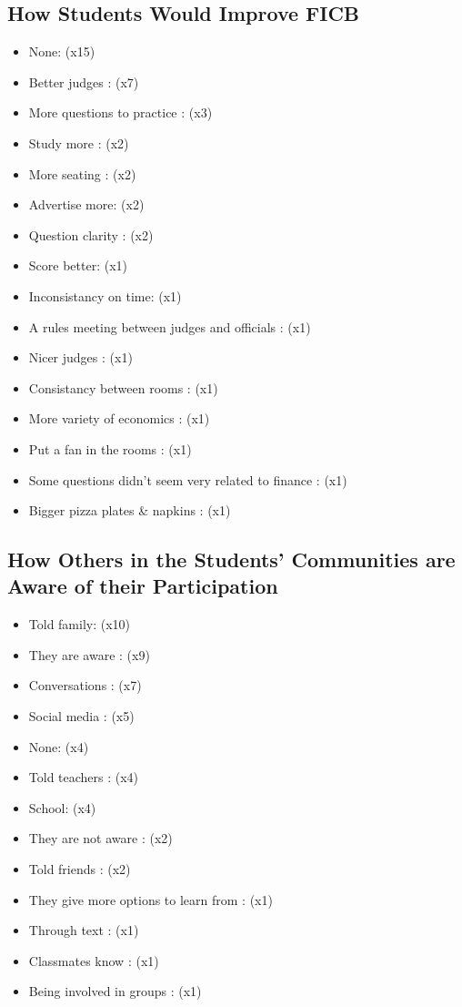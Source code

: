 \documentclass{article}%
\begin{document}
\begin{multicols}{2}%
\section{How Students Would Improve FICB}%
\label{sec:HowStudentsWouldImproveFICB}%
\begin{itemize}%
\item%
None: (x15)%
\item%
Better judges : (x7)%
\item%
More questions to practice : (x3)%
\item%
Study more : (x2)%
\item%
More seating : (x2)%
\item%
Advertise more: (x2)%
\item%
Question clarity : (x2)%
\item%
Score better: (x1)%
\item%
Inconsistancy on time: (x1)%
\item%
A rules meeting between judges and officials : (x1)%
\item%
Nicer judges : (x1)%
\item%
Consistancy between rooms : (x1)%
\item%
More variety of economics : (x1)%
\item%
Put a fan in the rooms : (x1)%
\item%
Some questions didn't seem very related to finance : (x1)%
\item%
Bigger pizza plates \& napkins : (x1)%
\end{itemize}

%
\end{multicols}%
\noindent\makebox[\linewidth]{\rule{\paperwidth}{0.4pt}}%
\begin{multicols}{2}%
\section{How Others in the Students' Communities are Aware of their Participation}%
\label{sec:HowOthersintheStudentsCommunitiesareAwareoftheirParticipation}%
\begin{itemize}%
\item%
Told family: (x10)%
\item%
They are aware : (x9)%
\item%
Conversations : (x7)%
\item%
Social media : (x5)%
\item%
None: (x4)%
\item%
Told teachers : (x4)%
\item%
School: (x4)%
\item%
They are not aware : (x2)%
\item%
Told friends : (x2)%
\item%
They give more options to learn from : (x1)%
\item%
Through text : (x1)%
\item%
Classmates know : (x1)%
\item%
Being involved in groups : (x1)%
\end{itemize}

%
\end{multicols}%
\end{document}
